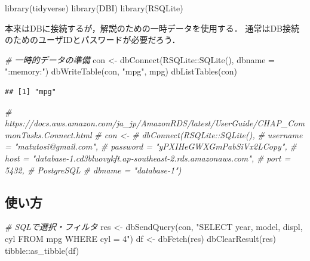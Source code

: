 \documentclass[
]{article}
\newenvironment{Shaded}{\begin{snugshade}}{\end{snugshade}}
\newcommand{\AttributeTok}[1]{\textcolor[rgb]{0.77,0.63,0.00}{#1}}
\newcommand{\CommentTok}[1]{\textcolor[rgb]{0.56,0.35,0.01}{\textit{#1}}}
\newcommand{\FunctionTok}[1]{\textcolor[rgb]{0.00,0.00,0.00}{#1}}
\newcommand{\NormalTok}[1]{#1}
\newcommand{\OtherTok}[1]{\textcolor[rgb]{0.56,0.35,0.01}{#1}}
\newcommand{\SpecialCharTok}[1]{\textcolor[rgb]{0.00,0.00,0.00}{#1}}
\newcommand{\StringTok}[1]{\textcolor[rgb]{0.31,0.60,0.02}{#1}}
\begin{document}
\begin{Shaded}
\begin{Highlighting}[]
\FunctionTok{library}\NormalTok{(tidyverse)}
\FunctionTok{library}\NormalTok{(DBI)}
\FunctionTok{library}\NormalTok{(RSQLite)}
\end{Highlighting}
\end{Shaded}

本来はDBに接続するが，解説のための一時データを使用する．
通常はDB接続のためのユーザIDとパスワードが必要だろう．

\begin{Shaded}
\begin{Highlighting}[]
  \CommentTok{\# 一時的データの準備}
\NormalTok{con }\OtherTok{\textless{}{-}} \FunctionTok{dbConnect}\NormalTok{(RSQLite}\SpecialCharTok{::}\FunctionTok{SQLite}\NormalTok{(), }\AttributeTok{dbname =} \StringTok{":memory:"}\NormalTok{)}
\FunctionTok{dbWriteTable}\NormalTok{(con, }\StringTok{"mpg"}\NormalTok{, mpg)}
\FunctionTok{dbListTables}\NormalTok{(con)}
\end{Highlighting}
\end{Shaded}

\begin{verbatim}
## [1] "mpg"
\end{verbatim}

\begin{Shaded}
\begin{Highlighting}[]
  \CommentTok{\# https://docs.aws.amazon.com/ja\_jp/AmazonRDS/latest/UserGuide/CHAP\_CommonTasks.Connect.html}
  \CommentTok{\# con \textless{}{-} }
  \CommentTok{\#   dbConnect(RSQLite::SQLite(), }
  \CommentTok{\#   username = "matutosi@gmail.com",}
  \CommentTok{\#   password = "yPXIHeGWXGmPabSiVx2LCopy",}
  \CommentTok{\#   host = "database{-}1.cd3bluovykft.ap{-}southeast{-}2.rds.amazonaws.com", }
  \CommentTok{\#   port = 5432, \# PostgreSQL}
  \CommentTok{\#   dbname = "database{-}1")}
\end{Highlighting}
\end{Shaded}

\hypertarget{ux4f7fux3044ux65b9-2}{%
\subsection{使い方}\label{ux4f7fux3044ux65b9-2}}

\begin{Shaded}
\begin{Highlighting}[]
  \CommentTok{\# SQLで選択・フィルタ}
\NormalTok{res }\OtherTok{\textless{}{-}} \FunctionTok{dbSendQuery}\NormalTok{(con, }\StringTok{"SELECT year, model, displ, cyl FROM mpg WHERE cyl = 4"}\NormalTok{)}
\NormalTok{df }\OtherTok{\textless{}{-}} \FunctionTok{dbFetch}\NormalTok{(res)}
\FunctionTok{dbClearResult}\NormalTok{(res)}
\NormalTok{tibble}\SpecialCharTok{::}\FunctionTok{as\_tibble}\NormalTok{(df)}
\end{Highlighting}
\end{Shaded}
\end{document}
